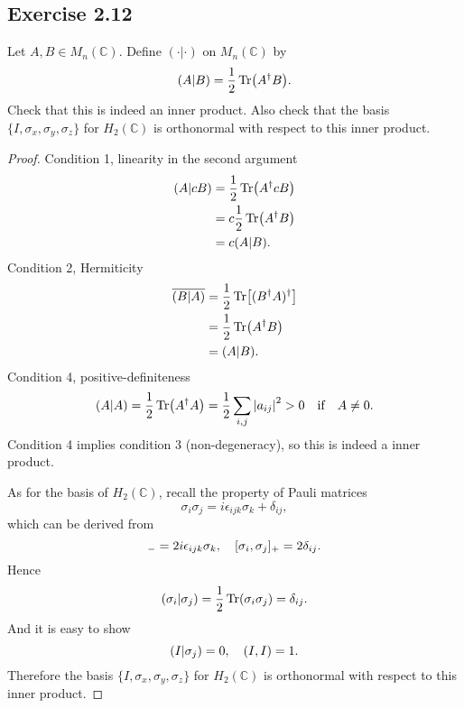 \documentclass[10pt]{article}
\begin{document}
\subsection{Exercise 2.12}
Let $A,B \in M_n(\mathbb{C})$. Define $(\cdot|\cdot)$ on $M_n(\mathbb{C})$ by
\begin{equation}
	(A|B) = \frac{1}{2} \Tr(A^{\dagger}B).
\end{equation}
Check that this is indeed an inner product. Also check that the basis $\{I, \sigma_x, \sigma_y, \sigma_z\}$ for $H_2(\mathbb{C})$ is orthonormal with respect to this inner product.

\begin{proof}
	Condition 1, linearity in the second argument
	\begin{align*}
		(A|cB) &= \frac{1}{2} \Tr(A^{\dagger}cB) \\
		&= c \frac{1}{2} \Tr(A^{\dagger}B) \\
		&= c(A|B).
	\end{align*}
	Condition 2, Hermiticity
	\begin{align*}
		\overline{(B|A)} &= \frac{1}{2}  \Tr[(B^{\dagger}A)^{\dagger}] \\
		&= \frac{1}{2} \Tr(A^{\dagger}B) \\
		&= (A|B).
	\end{align*}
	Condition 4, positive-definiteness
	\begin{equation}
		(A|A) = \frac{1}{2} \Tr(A^{\dagger}A) = \frac{1}{2} \sum_{i,j} \abs{a_{ij}}^2 > 0\qif A \neq 0.
	\end{equation}
	Condition 4 implies condition 3 (non-degeneracy), so this is indeed a inner product.

	As for the basis of $H_2(\mathbb{C})$, recall the property of Pauli matrices
	\begin{equation}
		\sigma_i \sigma_j = i \epsilon_{ijk} \sigma_k + \delta_{ij},
	\end{equation}
	which can be derived from
	\begin{equation}
		[\sigma_i, \sigma_j]_- = 2i \epsilon_{ijk} \sigma_k\qc [\sigma_i, \sigma_j]_+ = 2 \delta_{ij}.
	\end{equation}
	Hence
	\begin{equation}
		(\sigma_i|\sigma_j) = \frac{1}{2} \Tr(\sigma_i \sigma_j) = \delta_{ij}.
	\end{equation}
	And it is easy to show
	\begin{equation}
		(I|\sigma_j) = 0\qc (I, I) = 1.
	\end{equation}
	Therefore the basis $\{I, \sigma_x, \sigma_y, \sigma_z\}$ for $H_2(\mathbb{C})$ is orthonormal with respect to this inner product.
\end{proof}
\end{document}
